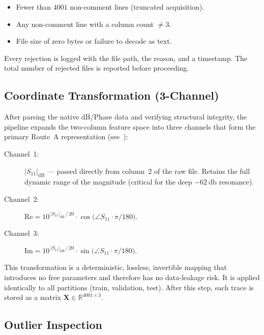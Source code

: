 \begin{itemize}
  \item Fewer than $4001$ non-comment lines (truncated acquisition).
  \item Any non-comment line with a column count $\neq 3$.
  \item File size of zero bytes or failure to decode as text.
\end{itemize}

\noindent
Every rejection is logged with the file path, the reason, and a
timestamp.  The total number of rejected files is reported before
proceeding.

\subsection{Coordinate Transformation (3-Channel)}
\label{sec:preproc:transform}

After parsing the native dB/Phase data and verifying structural
integrity, the pipeline expands the two-column feature space into
three channels that form the primary Route~A representation
(see~):

\begin{description}
  \item[Channel~1:] $|S_{11}|_{\text{dB}}$ — passed directly from
        column~2 of the raw file.  Retains the full dynamic range of
        the magnitude (critical for the deep $\SI{-62}{\decibel}$
        resonance).
  \item[Channel~2:]
        $\text{Re} = 10^{\,|S_{11}|_{\text{dB}}\,/\,20} \cdot
        \cos\!\bigl(\angle S_{11}\cdot\pi/180\bigr)$.
  \item[Channel~3:]
        $\text{Im} = 10^{\,|S_{11}|_{\text{dB}}\,/\,20} \cdot
        \sin\!\bigl(\angle S_{11}\cdot\pi/180\bigr)$.
\end{description}

\noindent
This transformation is a deterministic, lossless, invertible mapping
that introduces no free parameters and therefore has no data-leakage
risk.  It is applied identically to all partitions (train, validation,
test).  After this step, each trace is stored as a matrix
$\mathbf{X} \in \mathbb{R}^{4001 \times 3}$.

\subsection{Outlier Inspection}
\label{sec:preproc:outliers}

